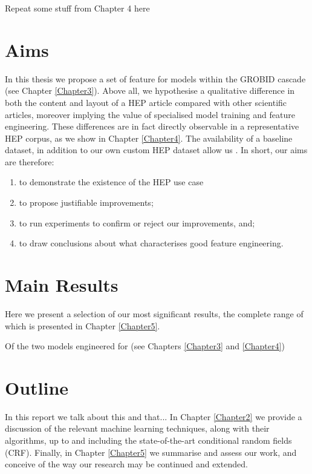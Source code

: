 Repeat some stuff from Chapter 4 here

\section{Aims}

In this thesis we propose a set of feature for models within the GROBID cascade (see Chapter \ref{Chapter3}). Above all, we hypothesise a qualitative difference in both the content and layout of a HEP article compared with other scientific articles, moreover implying the value of specialised model training and feature engineering. These differences are in fact directly observable in a representative HEP corpus, as we show in Chapter \ref{Chapter4}. The availability of a baseline dataset, in addition to our own custom HEP dataset allow us  . In short, our aims are therefore:

\begin{enumerate}
\item to demonstrate the existence of the HEP use case
\item to propose justifiable improvements;
\item to run experiments to confirm or reject our improvements, and;
\item to draw conclusions about what characterises good feature engineering.
\end{enumerate}

\section{Main Results}

Here we present a selection of our most significant results, the complete range of which is presented in Chapter \ref{Chapter5}.

Of the two models engineered for (see Chapters \ref{Chapter3} and \ref{Chapter4})

\section{Outline}

In this report we talk about this and that... In Chapter \ref{Chapter2} we provide a discussion of the relevant machine learning techniques, along with their algorithms, up to and including the state-of-the-art conditional random fields (CRF). Finally, in Chapter \ref{Chapter5} we summarise and assess our work, and conceive of the way our research may be continued and extended.